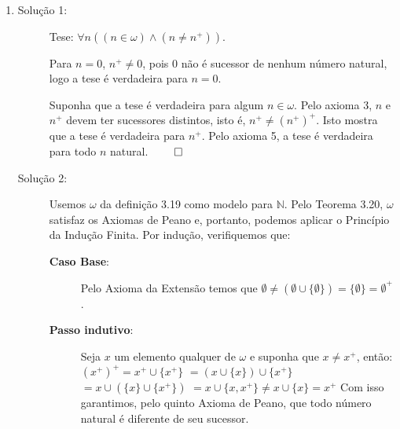 \begin{enumerate}[label=(\alph{*})]
	\item 
		\begin{description}
			\item[Solução 1:] Tese: $\forall n((n\in\omega)\wedge(n\neq n^+))$.
	
			Para $n=0$, $n^+\neq0$, pois $0$ não é sucessor de nenhum número natural, logo a tese é verdadeira para $n=0$.
			
			Suponha que a tese é verdadeira para algum $n\in\omega$. Pelo axioma 3, $n$ e $n^+$ devem ter sucessores distintos, isto é, $n^+\neq(n^+)^+$. Isto mostra que a tese é verdadeira para $n^+$. Pelo axioma 5, a tese é verdadeira para todo $n$ natural. $\qed$
			\item[Solução 2:] Usemos $\omega$ da definição 3.19 como modelo para $\mathbb{N}$. Pelo Teorema 3.20, $\omega$ satisfaz os Axiomas de Peano e, portanto, podemos aplicar o Princípio da Indução Finita. Por indução, verifiquemos que:
				\begin{description}
					\item[\textbf{Caso Base}:] Pelo Axioma da Extensão temos que $\emptyset \neq (\emptyset \cup \{\emptyset\}) = \{\emptyset\} = \emptyset^+$.
					\item[\textbf{Passo indutivo}:] Seja $x$ um elemento qualquer de $\omega$ e suponha que $x \neq x^+$, então: \newline \newline $(x^+)^+ = x^+ \cup \{x^+\}$ \newline $=  (x \cup \{x\}) \cup \{x^+\}$ \newline $= x \cup (\{x\} \cup \{x^+\})$ \newline $= x \cup \{x, x^+\} \neq x \cup \{x\} = x^+$ \newline \newline Com isso garantimos, pelo quinto Axioma de Peano, que todo número natural é diferente de seu sucessor. \cqd
				\end{description}
		\end{description}
	

\end{enumerate}
